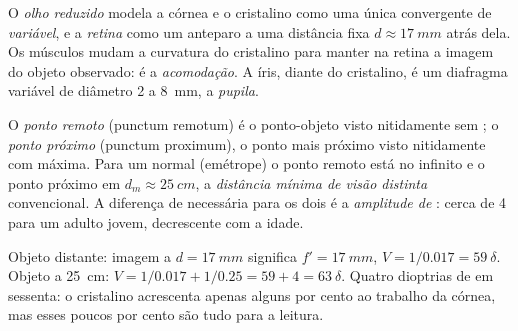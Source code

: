 \begin{definition}\label{def:b1:optical-instruments:eye}
O \emph{olho reduzido} modela a córnea e o cristalino como uma
única  convergente de  \emph{variável}, e a
\emph{retina} como um anteparo a uma distância fixa $d \approx \qty{17}{mm}$
atrás dela. Os músculos mudam a curvatura do cristalino para manter na retina a imagem do
objeto observado: é a \emph{acomodação}. A íris,
diante do cristalino, é um diafragma variável de diâmetro \qty{2}{} a
\qty{8}{mm}, a \emph{pupila}.
\end{definition}

\begin{definition}\label{def:b1:optical-instruments:punctum}
O \emph{ponto remoto} (punctum remotum) é o ponto-objeto visto
nitidamente sem ; o \emph{ponto próximo} (punctum proximum),
o ponto mais próximo visto nitidamente com  máxima. Para um  normal
(emétrope) o ponto remoto está no infinito e o ponto próximo em
$d_m \approx \qty{25}{cm}$, a \emph{distância mínima de visão
distinta} convencional. A diferença de  necessária para os dois é a
\emph{amplitude de }: cerca de \qty{4}{\delta} para um
adulto jovem, decrescente com a idade.
\end{definition}

\begin{example}\label{ex:b1:optical-instruments:vergence}
Objeto distante: imagem a $d = \qty{17}{mm}$ significa $f' = \qty{17}{mm}$,
$V = 1/0.017 = \qty{59}{\delta}$. Objeto a \qty{25}{cm}:
$V = 1/0.017 + 1/0.25 = 59 + 4 = \qty{63}{\delta}$. Quatro dioptrias de
 em sessenta: o cristalino acrescenta apenas alguns por cento
ao trabalho da córnea, mas esses poucos por cento são tudo para a leitura.
\end{example}

